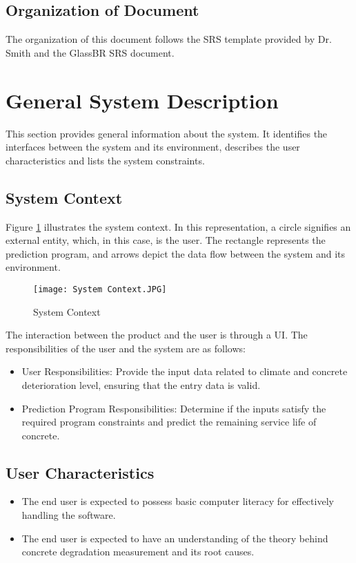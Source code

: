 \documentclass[12pt]{article}
\begin{document}
\subsection{Organization of Document}

The organization of this document follows the SRS template provided by Dr. Smith and the GlassBR SRS document\cite{glassbr_spec}.

\section{General System Description}

This section provides general information about the system.  It identifies the interfaces between the system and its environment, describes the user characteristics and lists the system constraints.  

\subsection{System Context}
{Figure \ref{fig:syscon}} illustrates the system context. In this representation, a circle signifies an external entity, which, in this case, is the user. The rectangle represents the prediction program, and arrows depict the data flow between the system and its environment.

\begin{figure}
    \centering
    \texttt{[image: System Context.JPG]}
    \caption{System Context}
    \label{fig:syscon}
\end{figure}

The interaction between the product and the user is through a UI. The responsibilities of the user and the system are as follows: 

\begin{itemize}
\item User Responsibilities: Provide the input data related to climate and concrete deterioration level, ensuring that the entry data is valid.
\end{itemize}
\begin{itemize}
\item Prediction Program Responsibilities: Determine if the inputs satisfy the required program constraints and predict the remaining service life of concrete.
\end{itemize}

\subsection{User Characteristics} \label{SecUserCharacteristics}
\begin{itemize}
\item The end user is expected to possess basic computer literacy for effectively handling the software.
\item The end user is expected to have an understanding of the theory behind concrete degradation measurement and its root causes.
\end{itemize}
\end{document}
